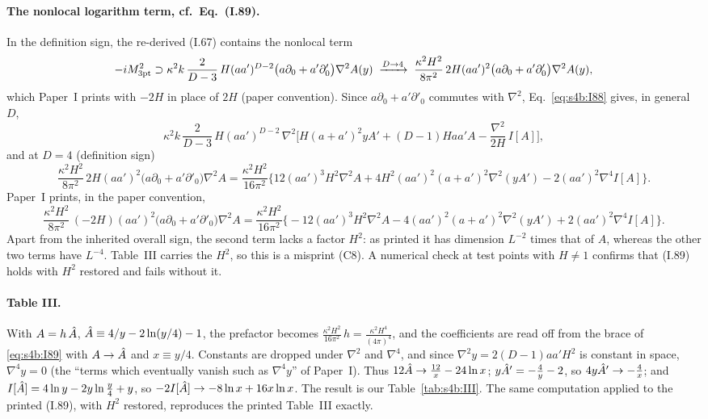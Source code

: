 \documentclass[aps,prd,onecolumn,10pt,nofootinbib,floatfix]{revtex4-2}
\newcommand{\PI}{Paper~I}
\newcommand{\eqI}[1]{(I.#1)}
\begin{document}
\paragraph*{The nonlocal logarithm term, cf.\ Eq.~(I.89).}
In the definition sign, the re-derived \eqI{67} contains the nonlocal term
\begin{equation}
-iM^2_{\rm 3pt}\supset\kappa^2k\,\frac{2}{D-3}\,H(aa')^{D-2}\big(a\partial_0+a'\partial'_0\big)\nabla^2A(y)
\;\xrightarrow{D\to4}\;\frac{\kappa^2H^2}{8\pi^2}\,2H(aa')^2\big(a\partial_0+a'\partial'_0\big)\nabla^2A(y),
\label{eq:s4b:log67}
\end{equation}
which \PI{} prints with $-2H$ in place of $2H$ (paper convention). Since $a\partial_0+a'\partial'_0$ commutes with
$\nabla^2$, Eq.~\eqref{eq:s4b:I88} gives, in general $D$,
\begin{equation}
\kappa^2k\,\frac{2}{D-3}\,H(aa')^{D-2}\,\nabla^2\Big[H(a+a')^2yA'+(D-1)Haa'A-\frac{\nabla^2}{2H}\,I[A]\Big],
\label{eq:s4b:I89D}
\end{equation}
and at $D=4$ (definition sign)
\begin{equation}
\frac{\kappa^2H^2}{8\pi^2}\,2H(aa')^2\big(a\partial_0+a'\partial'_0\big)\nabla^2A
=\frac{\kappa^2H^2}{16\pi^2}\Big\{12(aa')^3H^2\nabla^2A+4H^2(aa')^2(a+a')^2\nabla^2(yA')-2(aa')^2\nabla^4I[A]\Big\}.
\label{eq:s4b:I89}
\end{equation}
\PI{} prints, in the paper convention,
\begin{equation*}
\frac{\kappa^2H^2}{8\pi^2}\,(-2H)(aa')^2\big(a\partial_0+a'\partial'_0\big)\nabla^2A
=\frac{\kappa^2H^2}{16\pi^2}\Big\{-12(aa')^3H^2\nabla^2A-4(aa')^2(a+a')^2\nabla^2(yA')+2(aa')^2\nabla^4I[A]\Big\}.
\end{equation*}
Apart from the inherited overall sign, the second term lacks a factor $H^2$: as printed it has dimension $L^{-2}$
times that of $A$, whereas the other two terms have $L^{-4}$. Table~III carries the $H^2$, so this is a misprint (C8). A
numerical check at test points with $H\neq1$ confirms that \eqI{89} holds with $H^2$ restored and fails without it.

\paragraph*{Table III.}
With $A=h\,\hat A$, $\hat A\equiv4/y-2\ln(y/4)-1$, the prefactor becomes
$\frac{\kappa^2H^2}{16\pi^2}\,h=\frac{\kappa^2H^4}{(4\pi)^4}$, and the coefficients are read off from the brace of
\eqref{eq:s4b:I89} with $A\to\hat A$ and $x\equiv y/4$. Constants are dropped under $\nabla^2$ and $\nabla^4$, and since
$\nabla^2y=2(D-1)aa'H^2$ is constant in space, $\nabla^4y=0$ (the ``terms which eventually vanish such as
$\nabla^4y$'' of \PI). Thus $12\hat A\to\frac{12}{x}-24\ln x$; $y\hat A'=-\frac4y-2$, so $4y\hat A'\to-\frac4x$; and
$I[\hat A]=4\ln y-2y\ln\frac y4+y$, so $-2I[\hat A]\to-8\ln x+16x\ln x$. The result is our Table~\ref{tab:s4b:III}.
The same computation applied to the printed \eqI{89}, with $H^2$ restored, reproduces the printed Table~III exactly.
\end{document}
